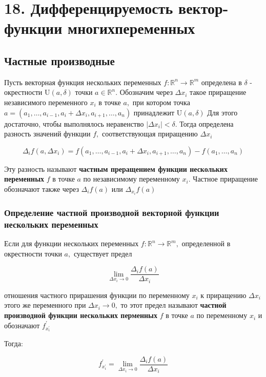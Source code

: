 \section{18. Дифференцируемость вектор-функции многихпеременных}
\subsection{Частные производные}

Пусть векторная функция нескольких переменных
\(f: \mathbb{R}^{n} \rightarrow \mathbb{R}^{m}\) определена в \(\delta\)
- окрестности \(\mathrm{U}(a, \delta)\) точки \(a \in \mathbb{R}^{n} .\)
Обозначим через \(\Delta x_{i}\) такое приращение независимого
переменного \(x_{i}\) в точке \(a,\) при котором точка
\(a=\left(a_{1}, \ldots, a_{i-1}, a_{i}+\Delta x_{i}, a_{i+1}, \ldots, a_{n}\right)\)
принадлежит \(\mathrm{U}(a, \delta)\) Для этого достаточно, чтобы
выполнялось неравенство \(\left|\Delta x_{i}\right|<\delta .\) Тогда
определена разность значений функции \(f,\) соответствующая приращению
\(\Delta x_{i}\)

\[\Delta_{i} f\left(a, \Delta x_{i}\right)=f\left(a_{1}, \ldots, a_{i-1}, a_{i}+\Delta x_{i}, a_{i+1}, \ldots, a_{n}\right)-f\left(a_{1}, \ldots, a_{n}\right)\]

Эту разность называют \textbf{частным преращением функции нескольких
переменных} \(f\) в точке \(a\) по независимому переменному \(x_{i} .\)
Частное приращение обозначают также через \(\Delta_{i} f(a)\) или
\(\Delta_{x_{i}} f(a)\)

\subsubsection{Определение частной производной векторной функции нескольких переменных}

Если для функции нескольких переменных
\(f: \mathbb{R}^{n} \rightarrow \mathbb{R}^{m},\) определенной в
окрестности точки \(a,\) существует предел

\[\lim _{\Delta x_{i} \rightarrow 0} \frac{\Delta_{i} f(a)}{\Delta x_{i}}\]

отношения частного прирашения функции по переменному \(x_{i}\) к
приращению \(\Delta x_{i}\) этого же переменного при
\(\Delta x_{i} \rightarrow 0,\) то этот предел называют \textbf{частной
производной функции нескольких перменных} \(f\) в точке \(a\) по
переменному \(x_{i}\) и обозначают \(f_{x_{i}^{\prime}}^{\prime}\)

Тогда:

\[ f_{x_{i}^{\prime}}^{\prime}=\lim _{\Delta x_{i} \rightarrow 0} \frac{\Delta_{i} f(a)}{\Delta x_{i}}\]

